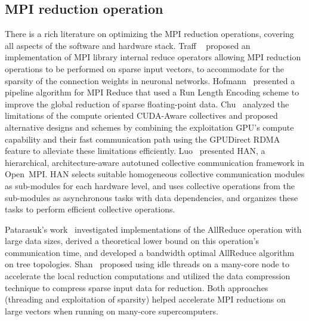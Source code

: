 \documentclass[5p,times,twocolumn]{elsarticle}
\newcommand{\ompi}[0]{Open~MPI\xspace}
\newcommand{\mpi}[0]{\textsc{MPI}\xspace}
\newcommand{\allreduce}[0]{AllReduce\xspace}
\begin{document}
\subsection{\mpi reduction operation}
There is a rich literature on optimizing the \mpi reduction operations, covering all aspects of the software and hardware stack. Traff
~\cite{NeutralMPIReduction} proposed an implementation of MPI library
internal reduce operators allowing MPI reduction operations to be performed on sparse input vectors, to accommodate for the sparsity of the connection weights in neuronal networks.
%
Hofmann~\cite{sparse-reduction} presented a pipeline algorithm for MPI Reduce
that used a Run Length Encoding scheme to improve the global reduction of sparse
floating-point data.
%
Chu~\cite{gpu-reduce} analyzed the limitations of the compute oriented CUDA-Aware
collectives and proposed alternative designs and schemes by combining the exploitation GPU's
compute capability and their fast communication
path using the GPUDirect RDMA feature to alleviate these limitations efficiently. 
%
Luo~\cite{luo-han} presented HAN, a hierarchical, architecture-aware autotuned collective communication
framework in \ompi. HAN selects suitable homogeneous collective communication
modules as sub-modules for each hardware level, and uses collective operations from
the sub-modules as asynchronous tasks with data dependencies, and organizes these tasks to perform efficient collective operations.
%

Patarasuk's work~\cite{allreduce-optimal} investigated implementations of the \allreduce operation
with large data sizes, derived a theoretical lower bound on this operation's communication time, and developed
a bandwidth optimal \allreduce algorithm on tree topologies.
%
Shan~\cite{shan-reduce} proposed using idle threads on a many-core node to accelerate
the local reduction computations and utilized the data compression technique to compress sparse input data for reduction.
Both approaches (threading and exploitation
of sparsity) helped accelerate MPI reductions on large vectors when
running on many-core supercomputers.
%
\end{document}
